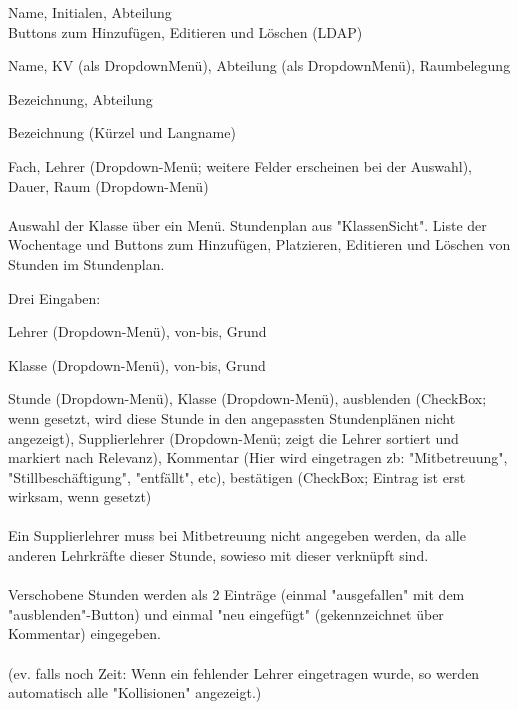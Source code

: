 \begin{description}[style=nextline]
	\item[Lehrer]
		Name, Initialen, Abteilung\\
		Buttons zum Hinzufügen, Editieren und Löschen (LDAP)
	\item[Klassen]
		Name, KV (als Dropdown­Menü), Abteilung (als Dropdown­Menü), Raumbelegung
	\item[Räume]
		Bezeichnung, Abteilung
	\item[Fächer]
		Bezeichnung (Kürzel und Langname)
	\item[Stunden(-pläne)]
		Fach, Lehrer (Dropdown-­Menü; weitere Felder erscheinen bei der Auswahl), Dauer, Raum (Dropdown-­Menü)\\
		\\
		Auswahl der Klasse über ein Menü. Stundenplan aus "Klassen­Sicht". Liste der Wochentage und Buttons zum Hinzufügen, Platzieren, Editieren und Löschen von Stunden im Stundenplan.
	\item[Supplierungen]
		Drei Eingaben:
		\begin{description}[style=nextline]
			\item[fehlende Lehrer]
				Lehrer (Dropdown­-Menü), von­-bis, Grund
			\item[fehlende Klassen]
				Klasse (Dropdown­-Menü), von­-bis, Grund
			\item[Supplierungen]
				Stunde (Dropdown­-Menü), Klasse (Dropdown-­Menü), ausblenden (Check­Box; wenn gesetzt, wird diese Stunde in den angepassten Stundenplänen nicht angezeigt), Supplierlehrer (Dropdown-­Menü; zeigt die Lehrer sortiert und markiert nach Relevanz), Kommentar (Hier wird eingetragen zb: "Mitbetreuung", "Stillbeschäftigung", "entfällt", etc), bestätigen (Check­Box; Eintrag ist erst wirksam, wenn gesetzt)\\
			\\
			Ein Supplierlehrer muss bei Mitbetreuung nicht angegeben werden, da alle anderen Lehrkräfte dieser Stunde, so­wie­so mit dieser verknüpft sind.\\
			\\
			Verschobene Stunden werden als 2 Einträge (einmal "ausgefallen" mit dem "ausblenden"-­Button) und einmal "neu eingefügt" (gekennzeichnet über Kommentar) eingegeben.\\
			\\
			(ev. falls noch Zeit: Wenn ein fehlender Lehrer eingetragen wurde, so werden automatisch alle "Kollisionen" angezeigt.)
		\end{description}

\end{description}
